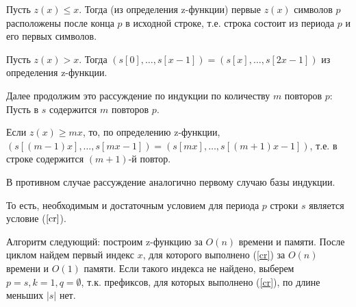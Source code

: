 \documentclass{article}
\begin{document}
Пусть $z(x)\leq x$. Тогда (из определения z-функции) первые $z(x)$ символов $p$ расположены после конца $p$ в исходной строке, т.е. строка состоит из периода $p$ и его первых символов.

Пусть $z(x)>x$. Тогда $(s[0],\dots,s[x-1])=(s[x],\dots,s[2x-1])$ из определения z-функции.

Далее продолжим это рассуждение по индукции по количеству $m$ повторов $p$: Пусть в $s$ содержится $m$ повторов $p$.

Если $z(x)\geq mx$, то, по определению z-функции,\newline $(s[(m-1)x],\dots,s[mx-1])=(s[mx],\dots,s[(m+1)x-1])$, т.е. в строке содержится $(m+1)$-й повтор.

В противном случае рассуждение аналогично первому случаю базы индукции.

То есть, необходимым и достаточным условием для периода $p$ строки $s$ является условие ($\ref{cr}$).

Алгоритм следующий: построим z-функцию за $O(n)$ времени и памяти. После циклом найдем первый индекс $x$, для которого выполнено (\ref{cr}) за $O(n)$ времени и $O(1)$ памяти. Если такого индекса не найдено, выберем $p=s, k=1, q=\emptyset$, т.к. префиксов, для которых выполнено (\ref{cr}), по длине меньших $|s|$ нет.
\end{document}
